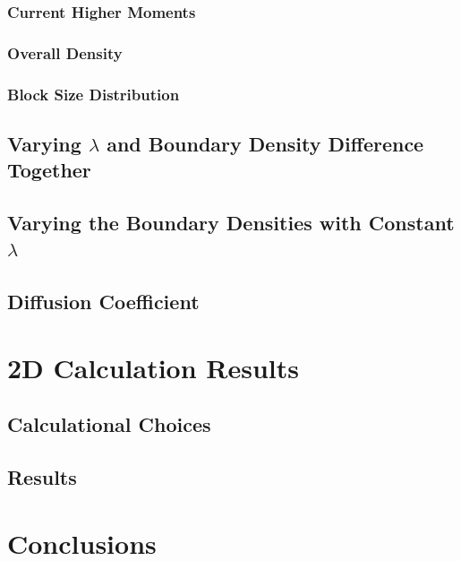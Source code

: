 \subsubsection{Current Higher Moments}

\subsubsection{Overall Density}

\subsubsection{Block Size Distribution}

\subsection{Varying $\lambda$ and Boundary Density Difference Together}
\subsection{Varying the Boundary Densities with Constant $\lambda$}
\subsection{Diffusion Coefficient}

\section{2D Calculation Results}
\subsection{Calculational Choices}
\subsection{Results}

\section{Conclusions}
